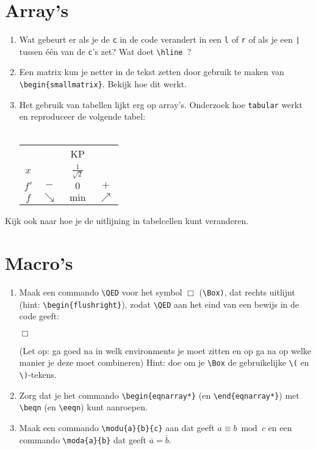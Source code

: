 \documentclass{article}
\newcommand{\beqn}{\begin{eqnarray*}}
\newcommand{\eeqn}{\end{eqnarray*}}
\begin{document}
\section{Array's}
	\begin{enumerate}
		\item Wat gebeurt er als je de \verb.c. in de code verandert in een \verb.l. of \verb.r. of als je een \verb.|. tussen \'e\'en van de \verb.c.'s zet? Wat doet \verb.\hline .?
		\item Een matrix kun je netter in de tekst zetten door gebruik te maken van \verb.\begin{smallmatrix}.. Bekijk hoe dit werkt.
		\item Het gebruik van tabellen lijkt erg op array's. Onderzoek hoe \verb.tabular. werkt en reproduceer de volgende tabel:\\
		\\
			\begin{tabular}{c|ccc}
		 		 		    & 			        & KP 			  & 				\\
				\(x\)		& 			        & \(\tfrac{1}{\sqrt{2}}\) 	& 				\\
				\hline
		 		\(f'\) 	& \(-\) 		    & \(0\) 		& \(+\) 			\\
		 		\(f\) 	& \(\searrow\)	& \(\min\)  & \(\nearrow\)		
			\end{tabular}
	\end{enumerate}
Kijk ook naar hoe je de uitlijning in tabelcellen kunt veranderen.
\section{Macro's}
\begin{enumerate}
	\item Maak een commando \verb.\QED. voor het symbol $\Box$ (\verb.\Box)., dat rechts uitlijnt (hint: \verb.\begin{flushright}.), zodat \verb.\QED. aan het eind van een bewijs in de code geeft:
		\begin{flushright}\(\Box\)\end{flushright}
(Let op: ga goed na in welk environments je moet zitten en op ga na op welke manier je deze moet combineren)
 Hint: doe om je \verb+\Box+ de gebruikelijke \verb+\(+ en \verb+\)+-tekens.
	\item Zorg dat je het commando \verb+\begin{eqnarray*}+ (en \verb+\end{eqnarray*}+) met \verb+\beqn+ (en \verb+\eeqn+) kunt aanroepen.
	\item Maak een commando \verb+\modu{a}{b}{c}+ aan dat geeft \(a \equiv b \bmod c\) en een commando \verb.\moda{a}{b}. dat geeft \(\overline{a} = \overline{b}\).
\end{enumerate}
\end{document}
